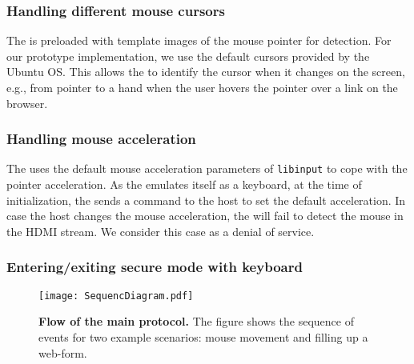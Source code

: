 \subsubsection{\bfseries Handling different mouse cursors} The \device is preloaded with template images of the mouse pointer for detection. For our \name prototype implementation, we use the default cursors provided by the Ubuntu OS. This allows the \device to identify the cursor when it changes on the screen, e.g., from pointer to a hand when the user hovers the pointer over a link on the browser. 

 
\subsubsection{\bfseries Handling mouse acceleration} The \device uses the default mouse acceleration parameters of \texttt{libinput} to cope with the pointer acceleration. As the \device emulates itself as a keyboard, at the time of initialization, the \device sends a command to the host to set the default acceleration. In case the host changes the mouse acceleration, the \device will fail to detect the mouse in the HDMI stream. We consider this case as a denial of service.

\subsubsection{\bfseries Entering/exiting secure mode with keyboard} 


\begin{figure}[t]
\centering
\texttt{[image: SequencDiagram.pdf]}
\caption{\textbf{Flow of the \name main protocol.} The figure shows the sequence of events for two example scenarios: mouse movement and filling up a web-form.}
\spacesave
\label{fig:sequence}
\centering
\end{figure}


